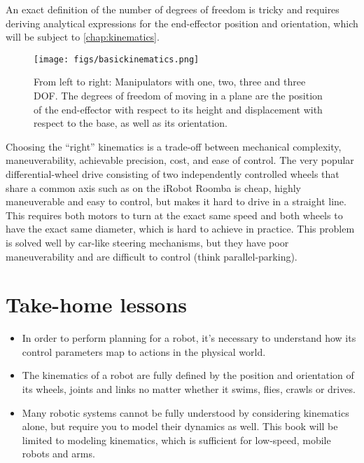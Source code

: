 An exact definition of the number of degrees of freedom is tricky and requires deriving analytical expressions for the end-effector position and orientation, which will be subject to \cref{chap:kinematics}.

\begin{figure}
	\centering
		\texttt{[image: figs/basickinematics.png]}
	\caption{From left to right: Manipulators with one, two, three and three DOF. The degrees of freedom of moving in a plane are the position of the end-effector with respect to its height and displacement with respect to the base, as well as its orientation.}
	\label{fig:basickinematics}
\end{figure}

Choosing the ``right'' kinematics is a trade-off between mechanical complexity, maneuverability, achievable precision, cost, and ease of control. The very popular differential-wheel drive consisting of two independently controlled wheels that share a common axis such as on the iRobot Roomba is cheap, highly maneuverable and easy to control, but makes it hard to drive in a straight line. This requires both motors to turn at the exact same speed and both wheels to have the exact same diameter, which is hard to achieve in practice. This problem is solved well by car-like steering mechanisms, but they have poor maneuverability and are difficult to control (think parallel-parking).


\section*{Take-home lessons}

\begin{itemize}
\item In order to perform planning for a robot, it's necessary to understand how its control parameters map to actions in the physical world.
\item The kinematics of a robot are fully defined by the position and orientation of its wheels, joints and links no matter whether it swims, flies, crawls or drives.
\item Many robotic systems cannot be fully understood by considering kinematics alone, but require you to model their dynamics as well. This book will be limited to modeling kinematics, which is sufficient for low-speed, mobile robots and arms.
\end{itemize}



